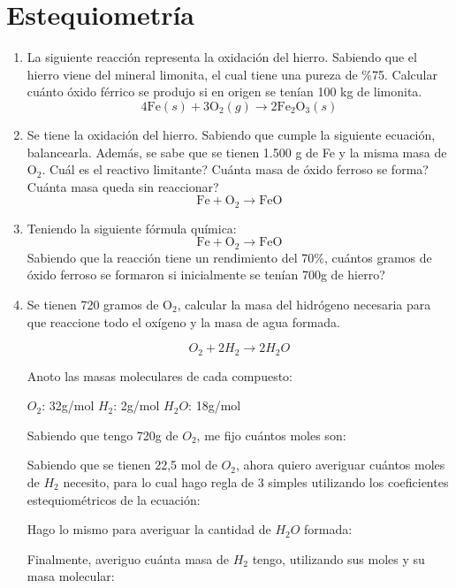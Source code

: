 \section{Estequiometría}

\begin{enumerate}
\item La siguiente reacción representa la oxidación del hierro.
Sabiendo que el hierro viene del mineral limonita, el
cual tiene una pureza de \%75. Calcular cuánto óxido férrico
se produjo si en origen se tenían 100 kg de limonita.
$$4\text{Fe} (s) + 3\text{O}_2 (g) \rightarrow 2\text{Fe}_2\text{O}_3 (s)$$

\item Se tiene la oxidación del hierro. Sabiendo que cumple la siguiente ecuación, balancearla. Además, se sabe que se tienen 1.500 g de Fe y la misma masa de O$_2$. Cuál es el reactivo limitante? Cuánta masa de óxido ferroso se forma? Cuánta masa queda sin reaccionar?
$$\text{Fe} + \text{O}_2 \rightarrow \text{Fe}\text{O}$$

\item Teniendo la siguiente fórmula química:
$$\text{Fe} + \text{O}_2 \rightarrow \text{Fe}\text{O}$$
Sabiendo que la reacción tiene un rendimiento del 70\%, cuántos gramos de óxido ferroso se formaron si inicialmente se tenían 700g de hierro?


\item Se tienen 720 gramos de O$_2$, calcular la masa del hidrógeno
necesaria para que reaccione todo el oxígeno y la masa de 
agua formada.

$$O_2 + 2H_2 \longrightarrow 2H_2O$$

Anoto las masas moleculares de cada compuesto:

\hfil$O_2$: 32g/mol\hfil
$H_2$: 2g/mol\hfil
$H_2O$: 18g/mol\hfil

\skipline
Sabiendo que tengo 720g de $O_2$, me fijo cuántos moles son:

Sabiendo que se tienen 22,5 mol de $O_2$, ahora quiero averiguar cuántos moles de $H_2$ necesito, para lo cual hago regla de 3 simples utilizando los coeficientes estequiométricos de la ecuación:

Hago lo mismo para averiguar la cantidad de $H_2O$ formada:

Finalmente, averiguo cuánta masa de $H_2$ tengo, utilizando sus moles y su masa molecular:


\end{enumerate}

